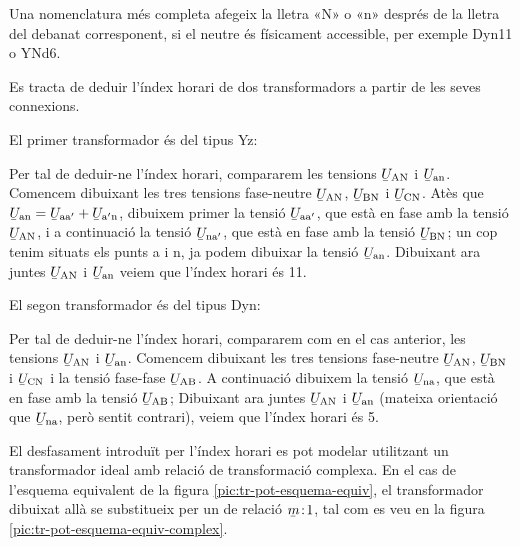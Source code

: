 Una nomenclatura més completa afegeix la lletra «N» o «n» després de la lletra del debanat corresponent, si el neutre és físicament accessible, per exemple Dyn11 o YNd6.

	
\begin{exemple}[\IndexHorari{}]
	\addcontentsxms{\IndexHorari}
    Es tracta de deduir l'índex horari de dos transformadors a partir de les seves connexions.


    El primer transformador és del tipus Yz:
     \vspace{-2mm}
    \begin{center}
        
    \end{center}
     Per tal de deduir-ne l'índex horari, compararem les tensions
    $\cmplx{U}\ped{AN}$ i $\cmplx{U}\ped{an}$. Comencem dibuixant les tres tensions fase-neutre $\cmplx{U}\ped{AN}$, $\cmplx{U}\ped{BN}$ i $\cmplx{U}\ped{CN}$. Atès que $\cmplx{U}\ped{an} = \cmplx{U}\ped{aa'} + \cmplx{U}\ped{a'n}$, dibuixem primer la tensió $\cmplx{U}\ped{aa'}$, que està en fase amb la tensió $\cmplx{U}\ped{AN}$, i a continuació la tensió $\cmplx{U}\ped{na'}$, que està en fase amb la tensió $\cmplx{U}\ped{BN}$; un cop tenim situats els punts a i n, ja podem dibuixar la tensió $\cmplx{U}\ped{an}$. Dibuixant ara juntes $\cmplx{U}\ped{AN}$ i $\cmplx{U}\ped{an}$  veiem que l'índex horari és 11.


     El segon transformador és del tipus Dyn:
      \vspace{-2mm}
    \begin{center}
       
    \end{center}
      Per tal de deduir-ne l'índex horari, compararem com en el cas anterior, les tensions $\cmplx{U}\ped{AN}$ i $\cmplx{U}\ped{an}$. Comencem dibuixant les tres tensions fase-neutre $\cmplx{U}\ped{AN}$, $\cmplx{U}\ped{BN}$ i $\cmplx{U}\ped{CN}$ i la tensió fase-fase $\cmplx{U}\ped{AB}$.  A continuació dibuixem la tensió $\cmplx{U}\ped{na}$, que està en fase amb la tensió $\cmplx{U}\ped{AB}$; Dibuixant ara juntes $\cmplx{U}\ped{AN}$ i $\cmplx{U}\ped{an}$ (mateixa orientació que $\cmplx{U}\ped{na}$, però sentit contrari),  veiem que l'índex horari és 5.
\end{exemple}

El desfasament introduït per l'índex horari es pot modelar utilitzant  un transformador ideal amb relació de transformació complexa. En el cas de l'esquema equivalent de la figura  \vref{pic:tr-pot-esquema-equiv}, el transformador  dibuixat allà
se substitueix per un de relació $\cmplx{m}\!:\!1$, tal com es veu en la figura \vref{pic:tr-pot-esquema-equiv-complex}.

